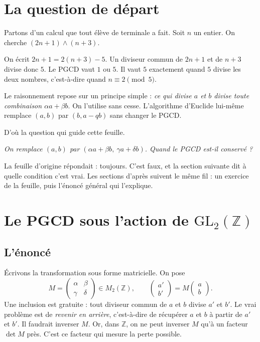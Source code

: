 \documentclass[11pt,a4paper]{article}
\theoremstyle{plain}
\theoremstyle{definition}
\theoremstyle{remark}
\newcommand{\Z}{\mathbb{Z}}
\newcommand{\GL}{\mathrm{GL}}
\newcommand{\pgcd}{\wedge}
\begin{document}
\tableofcontents

\section{La question de départ}

Partons d'un calcul que tout élève de terminale a fait. Soit $n$ un entier. On cherche $(2n+1)\pgcd(n+3)$.

On écrit $2n+1=2(n+3)-5$. Un diviseur commun de $2n+1$ et de $n+3$ divise donc $5$. Le PGCD vaut $1$ ou $5$. Il vaut $5$ exactement quand $5$ divise les deux nombres, c'est-à-dire quand $n\equiv2\pmod5$.

Le raisonnement repose sur un principe simple : \emph{ce qui divise $a$ et $b$ divise toute combinaison $\alpha a+\beta b$}. On l'utilise sans cesse. L'algorithme d'Euclide lui-même remplace $(a,b)$ par $(b,a-qb)$ sans changer le PGCD.

D'où la question qui guide cette feuille.

\begin{center}
\emph{On remplace $(a,b)$ par $(\alpha a+\beta b,\ \gamma a+\delta b)$. Quand le PGCD est-il conservé ?}
\end{center}

La feuille d'origine répondait : toujours. C'est faux, et la section suivante dit à quelle condition c'est vrai. Les sections d'après suivent le même fil : un exercice de la feuille, puis l'énoncé général qui l'explique.

\section{Le PGCD sous l'action de \texorpdfstring{$\GL_2(\Z)$}{GL2(Z)}}

\subsection{L'énoncé}

Écrivons la transformation sous forme matricielle. On pose
\[
  M=\begin{pmatrix}\alpha&\beta\\\gamma&\delta\end{pmatrix}\in M_2(\Z),
  \qquad
  \begin{pmatrix}a'\\b'\end{pmatrix}=M\begin{pmatrix}a\\b\end{pmatrix}.
\]
Une inclusion est gratuite : tout diviseur commun de $a$ et $b$ divise $a'$ et $b'$. Le vrai problème est de \emph{revenir en arrière}, c'est-à-dire de récupérer $a$ et $b$ à partir de $a'$ et $b'$. Il faudrait inverser $M$. Or, dans $\Z$, on ne peut inverser $M$ qu'à un facteur $\det M$ près. C'est ce facteur qui mesure la perte possible.
\end{document}
